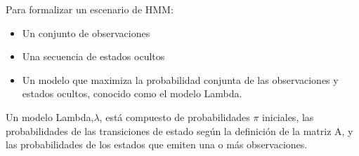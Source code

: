 Para formalizar un escenario de HMM:

\begin{itemize}
	\item Un conjunto de observaciones
	\item Una secuencia de estados ocultos
	\item Un modelo que maximiza la probabilidad conjunta de las observaciones y estados ocultos, conocido como el modelo Lambda.

\end{itemize}


Un modelo Lambda,$\lambda$, está compuesto de probabilidades $\pi$ iniciales, las probabilidades de las transiciones de estado según la definición de la matriz A, y las probabilidades de los estados que emiten una o más observaciones.
















\vspace{1cm}



